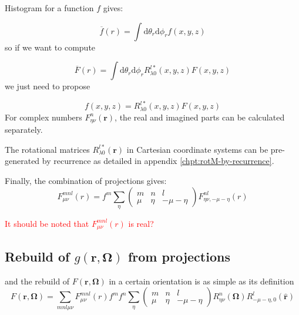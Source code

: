 Histogram for a function $f$ gives:

\begin{equation}
\overline{f}(r)=\int\mathrm{d}\theta_{r}\mathrm{d}\phi_{r}f(x,y,z)
\end{equation}
so if we want to compute

\begin{equation}
\overline{F}(r)=\int\mathrm{d}\theta_{r}\mathrm{d}\phi_{r}R_{\lambda0}^{l*}(x,y,z)F(x,y,z)
\end{equation}
we just need to propose 

\begin{equation}
f(x,y,z)=R_{\lambda0}^{l*}(x,y,z)F(x,y,z)
\end{equation}
For complex numbers $F_{\eta\nu}^{n}(\mathbf{r})$, the real and imagined
parts can be calculated separately.

The rotational matrices $R_{\lambda0}^{l*}(\mathbf{r})$ in Cartesian
coordinate systems can be pre-generated by recurrence as detailed in
appendix \ref{chpt:rotM-by-recurrence}. 

Finally, the combination of projections gives:
\begin{equation}
F_{\mu\nu}^{mnl}(r)=f^{m}\sum_{\eta}\left(\begin{array}{ccc}
m & n & l\\
\mu & \eta & -\mu-\eta
\end{array}\right)F_{\eta\nu,-\mu-\eta}^{nl}(r)
\end{equation}


\textcolor{red}{It should be noted that $F_{\mu\nu}^{mnl}(r)$ is
real?}


\subsection{Rebuild of $g(\mathbf{r},\mathbf{\Omega})$ from projections}

and the rebuild of $F(\mathbf{r},\mathbf{\Omega})$ in a certain orientation
is as simple as its definition
\begin{equation}
F(\mathbf{r},\mathbf{\Omega})=\sum_{mnl\mu\nu}F_{\mu\nu}^{mnl}(r)f^{m}f^{n}\sum_{\eta}\left(\begin{array}{ccc}
m & n & l\\
\mu & \eta & -\mu-\eta
\end{array}\right)R_{\eta\nu}^{n}(\mathbf{\Omega})R_{-\mu-\eta,0}^{l}(\mathbf{\hat{r}})\label{eq:bwd-1}
\end{equation}



